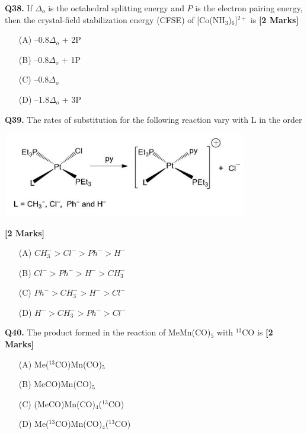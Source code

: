 \documentclass[11pt]{article}
\newcommand{\questionb}[2]{
    \noindent\textbf{Q#2.} #1 \hfill \textbf{[2 Marks]}
}
\begin{document}
\questionb{If \( \Delta_o \) is the octahedral splitting energy and \( P \) is the electron pairing energy, then the crystal-field stabilization energy (CFSE) of [Co(NH\(_3\))\(_6\)]\(^{2+}\) is}{38}
\begin{enumerate}
    \item[(A)] –0.8\(\Delta_o\) + 2P
    \item[(B)] –0.8\(\Delta_o\) + 1P
    \item[(C)] –0.8\(\Delta_o\)
    \item[(D)] –1.8\(\Delta_o\) + 3P
\end{enumerate}
\vspace{0.5cm}

\questionb{The rates of substitution for the following reaction vary with L in the order\\
\begin{center}
\includegraphics[width=0.8\textwidth]{figures/39.png}
\end{center}}{39}
\begin{enumerate}
    \item[(A)] $CH_3^- > Cl^- > Ph^- > H^-$
    \item[(B)] $Cl^- > Ph^- > H^- > CH_3^-$
    \item[(C)] $Ph^- > CH_3^- > H^- > Cl^-$
    \item[(D)] $H^- > CH_3^- > Ph^- > Cl^-$
\end{enumerate}
\vspace{0.5cm}

\questionb{The product formed in the reaction of MeMn(CO)\(_5\) with \(^{13}\)CO is}{40}
\begin{enumerate}
    \item[(A)] Me(\(^{13}\)CO)Mn(CO)\(_5\)
    \item[(B)] MeCO)Mn(CO)\(_5\)
    \item[(C)] (MeCO)Mn(CO)\(_4\)(\(^{13}\)CO)
    \item[(D)] Me(\(^{13}\)CO)Mn(CO)\(_4\)(\(^{13}\)CO)
\end{enumerate}
\vspace{0.5cm}
\end{document}

